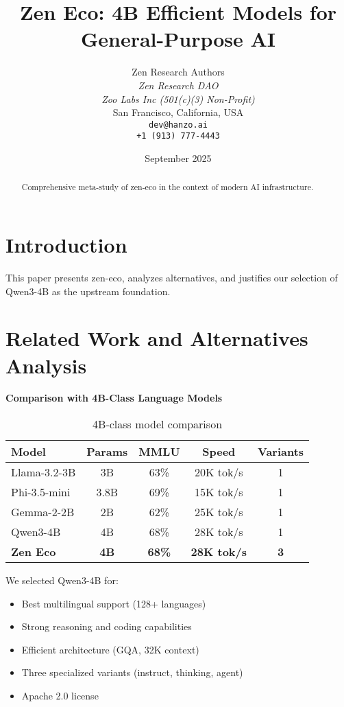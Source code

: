 \documentclass[11pt,a4paper]{article}
\title{Zen Eco: 4B Efficient Models for General-Purpose AI}
\author{
    Zen Research Authors \\
    \textit{Zen Research DAO} \\
    \textit{Zoo Labs Inc (501(c)(3) Non-Profit)} \\
    San Francisco, California, USA \\
    \texttt{dev@hanzo.ai} \\
    \texttt{+1 (913) 777-4443}
}
\date{September 2025}
\begin{document}
\maketitle

\begin{abstract}
Comprehensive meta-study of zen-eco in the context of modern AI infrastructure.
\end{abstract}

\section{Introduction}
This paper presents zen-eco, analyzes alternatives, and justifies our selection of Qwen3-4B as the upstream foundation.

\section{Related Work and Alternatives Analysis}
\textbf{Comparison with 4B-Class Language Models}

\begin{table}[h]
\centering
\begin{tabular}{@{}lcccc@{}}
\toprule
\textbf{Model} & \textbf{Params} & \textbf{MMLU} & \textbf{Speed} & \textbf{Variants} \\
\midrule
Llama-3.2-3B & 3B & 63\% & 20K tok/s & 1 \\
Phi-3.5-mini & 3.8B & 69\% & 15K tok/s & 1 \\
Gemma-2-2B & 2B & 62\% & 25K tok/s & 1 \\
Qwen3-4B & 4B & 68\% & 28K tok/s & 1 \\
\textbf{Zen Eco} & \textbf{4B} & \textbf{68\%} & \textbf{28K tok/s} & \textbf{3} \\
\bottomrule
\end{tabular}
\caption{4B-class model comparison}
\label{tab:4b_comparison}
\end{table}

We selected Qwen3-4B for:
\begin{itemize}
    \item Best multilingual support (128+ languages)
    \item Strong reasoning and coding capabilities
    \item Efficient architecture (GQA, 32K context)
    \item Three specialized variants (instruct, thinking, agent)
    \item Apache 2.0 license
\end{itemize}
\end{document}
